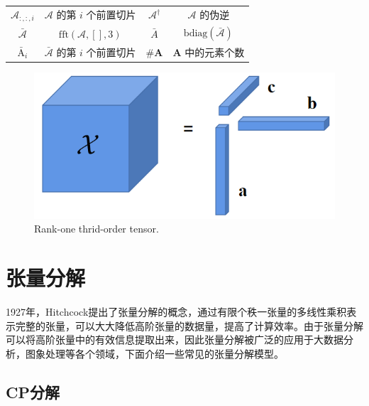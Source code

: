 \begin{table}[]
\begin{tabular}{c c|c c}
		
		$ \mathcal{A}_{:,:,i} $     & $ \mathcal{A}$ 的第 $ i $ 个前置切片   &     $\mathcal{A}^{\dag} $                         & $ \mathcal{A} $ 的伪逆                                            \\  
		$ \mathcal{\bar A} $                           &  $ \mathrm{fft}(\mathcal{A},[],3) $                                                &        $\bar A$                      &     $ \mathrm{bdiag}(\mathcal{\bar A})$           \\  
		$ \mathrm{\bar A}_{i} $                        & $ \mathcal{\bar A} $ 的第 $ i $ 个前置切片         	&                           $\#\textbf{A}$  	&$ \textbf{A} $ 中的元素个数                   \\ \bottomrule
	\end{tabular}
\end{table}



\begin{figure}[htbp]
	\centering
	\includegraphics[scale=0.5]{pic/chap2/4.png}
	{Rank-one thrid-order tensor.}
	\label{figure_rankone}
\end{figure}



\vbox{}
\section{张量分解}
\vbox{}

1927年，Hitchcock\cite{hitchcock1927expression}提出了张量分解的概念，通过有限个秩一张量的多线性乘积表示完整的张量，可以大大降低高阶张量的数据量，提高了计算效率。由于张量分解可以将高阶张量中的有效信息提取出来，因此张量分解被广泛的应用于大数据分析\cite{song_tensor_2019,sael_scalable_2015}，图象处理\cite{zhou_tensor_2017,song_nonlocal_2018}等各个领域，下面介绍一些常见的张量分解模型。

\subsection{CP分解}

